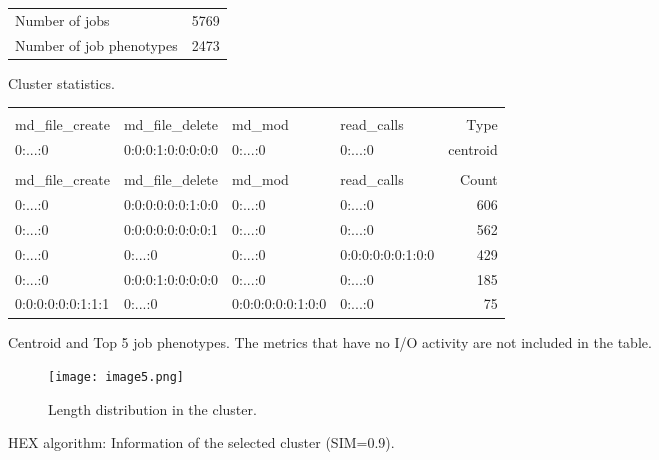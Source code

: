 \documentclass{jhps}
\begin{document}
\begin{figure}
	\begin{subtable}{\textwidth}
		\centering
		\begin{tabular}{ll}
			\centering
			Number of jobs & 5769 \\
			Number of job phenotypes & 2473 \\
		\end{tabular}
		\caption{Cluster statistics.}
		\label{cluster:hex_lev:stats}
	\end{subtable}
	\medskip
	\begin{subtable}{\textwidth}
		\centering
		\begin{tiny}
			\begin{tabular}{llll|r}
				\rowcolor{tblhead}
				\multicolumn{4}{l|}{Hexadecimal coding} & \\
				\rowcolor{tblhead}
				md\_file\_create  & md\_file\_delete  & md\_mod           & read\_calls       & Type     \\
				\hline
				0:...:0           & 0:0:0:1:0:0:0:0:0 & 0:...:0           & 0:...:0           & centroid \\
				\multicolumn{5}{l}{}\\
				\rowcolor{tblhead}
				md\_file\_create  & md\_file\_delete  & md\_mod           & read\_calls       & Count    \\
				\hline
				0:...:0           & 0:0:0:0:0:0:1:0:0 & 0:...:0           & 0:...:0           & 606      \\
				0:...:0           & 0:0:0:0:0:0:0:0:1 & 0:...:0           & 0:...:0           & 562      \\
				0:...:0           & 0:...:0           & 0:...:0           & 0:0:0:0:0:0:1:0:0 & 429      \\
				0:...:0           & 0:0:0:1:0:0:0:0:0 & 0:...:0           & 0:...:0           & 185      \\
				0:0:0:0:0:0:1:1:1 & 0:...:0           & 0:0:0:0:0:0:1:0:0 & 0:...:0           & 75       \\
			\end{tabular}
		\end{tiny}
		\caption{Centroid and Top 5 job phenotypes. The metrics that have no I/O activity are not included in the table.}
		\label{cluster:hex_lev:top_jobs}
	\end{subtable}
	\medskip
	\begin{subfigure}{\textwidth}
		\centering
		\texttt{[image: image5.png]}
		\caption{Length distribution in the cluster.}
		\label{cluster:hex_lev:length}
	\end{subfigure}
	\caption{HEX algorithm: Information of the selected cluster (SIM=0.9).}
	\label{cluster:hex_lev}
\end{figure}
\end{document}
